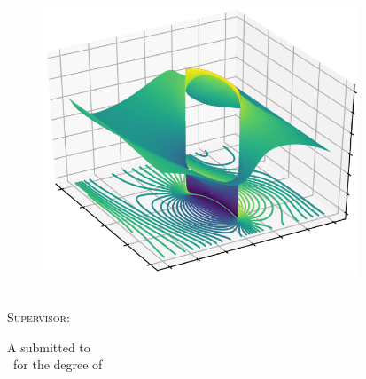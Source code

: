 \documentclass[../main.tex]{subfiles} %
\newcommand\TitleHUGE{\fontsize{32}{40}\selectfont} %
\begin{document}

\begin{titlepage} %
    \centering
    
    \textsc{\TitleHUGE{\Title}}\\
    
    \begin{figure}[ht!] %
        \begin{center}
            \includegraphics[height=8cm]{beforeText/frontpageImages/frontPageImage.PNG}
        \end{center}
    \end{figure} %
    
    \vfill
    
    \textsc{\LARGE{\Author}}\\\vspace{2em} %
    \textsc{\large{Supervisor: \Supervisor}}\\\bigskip %
    
    \vfill
    
    A \MakeLowercase{\Doctype} submitted to\\
    \University\ for the degree of\\
    \textsc{\Degree}\bigskip\\
    

\end{titlepage}
\end{document}

